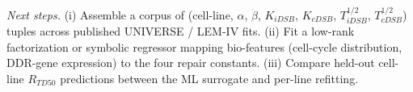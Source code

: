 \begin{enumerate}
\emph{Next steps.} (i) Assemble a corpus of (cell-line, $\alpha$, $\beta$,
$K_{iDSB}$, $K_{cDSB}$, $T_{iDSB}^{1/2}$, $T_{cDSB}^{1/2}$) tuples across
published UNIVERSE / LEM-IV fits. (ii) Fit a low-rank factorization or
symbolic regressor mapping bio-features (cell-cycle distribution,
DDR-gene expression) to the four repair constants. (iii) Compare held-out
cell-line $R_{TD50}$ predictions between the ML surrogate and per-line
refitting.

\end{enumerate}
